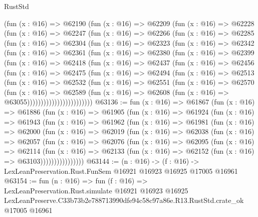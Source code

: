 \begin{lexlean}{RustStd}
\begin{coremodule}
    (fun (x : @16) =>
    @62190
      (fun (x : @16) =>
      @62209
        (fun (x : @16) =>
        @62228
          (fun (x : @16) =>
          @62247
            (fun (x : @16) =>
            @62266
              (fun (x : @16) =>
              @62285
                (fun (x : @16) =>
                @62304
                  (fun (x : @16) =>
                  @62323
                    (fun (x : @16) =>
                    @62342
                      (fun (x : @16) =>
                      @62361
                        (fun (x : @16) =>
                        @62380
                          (fun (x : @16) =>
                          @62399
                            (fun (x : @16) =>
                            @62418
                              (fun (x : @16) =>
                              @62437
                                (fun (x : @16) =>
                                @62456
                                  (fun (x : @16) =>
                                  @62475
                                    (fun (x : @16) =>
                                    @62494
                                      (fun (x : @16) =>
                                      @62513
                                        (fun (x : @16) =>
                                        @62532
                                          (fun (x : @16) =>
                                          @62551
                                            (fun (x : @16) =>
                                            @62570
                                              (fun (x : @16) =>
                                              @62589
                                                (fun (x : @16) =>
                                                @62608
                                                  (fun (x : @16) => @63055))))))))))))))))))))))))
@63136 := fun (x : @16) =>
  @61867
    (fun (x : @16) =>
    @61886
      (fun (x : @16) =>
      @61905
        (fun (x : @16) =>
        @61924
          (fun (x : @16) =>
          @61943
            (fun (x : @16) =>
            @61962
              (fun (x : @16) =>
              @61981
                (fun (x : @16) =>
                @62000
                  (fun (x : @16) =>
                  @62019
                    (fun (x : @16) =>
                    @62038
                      (fun (x : @16) =>
                      @62057
                        (fun (x : @16) =>
                        @62076
                          (fun (x : @16) =>
                          @62095
                            (fun (x : @16) =>
                            @62114
                              (fun (x : @16) =>
                              @62133
                                (fun (x : @16) => @62152 (fun (x : @16) => @63103))))))))))))))))
@63144 := (n : @16) ->
  (f : @16) -> LexLeanPreservation.Rust.FunSem @16921 @16923 @16925 @17005 @16961
@63154 := fun (n : @16) =>
  fun (f : @16) =>
  LexLeanPreservation.Rust.simulate
    @16921
    @16923
    @16925
    LexLeanPreserve.C33b73b2e788713990dfe94c58c97a86e.R13.RustStd.crate_ok
    @17005
    @16961
\end{coremodule}
\end{lexlean}
